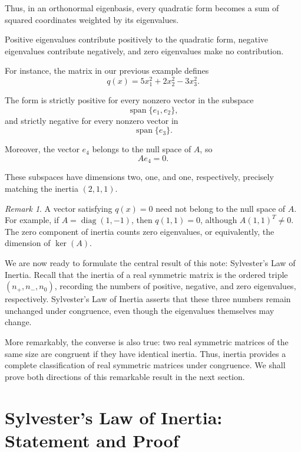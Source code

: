 \documentclass[11pt]{article}
\theoremstyle{definition}
\theoremstyle{remark}
\newtheorem{remark}[theorem]{Remark}
\begin{document}
Thus, in an orthonormal eigenbasis, every
quadratic form becomes a sum of squared
coordinates weighted by its eigenvalues.

Positive eigenvalues contribute positively
to the quadratic form, negative eigenvalues
contribute negatively, and zero eigenvalues
make no contribution.

For instance, the matrix in our previous
example defines
\[
    q(x)=5x_1^2+2x_2^2-3x_3^2.
\]

The form is strictly positive for every
nonzero vector in the subspace
\[
    \operatorname{span}\{e_1,e_2\},
\]
and strictly negative for every nonzero
vector in
\[
    \operatorname{span}\{e_3\}.
\]

Moreover, the vector $e_4$ belongs to the
null space of $A$, so
\[
    Ae_4=0.
\]

These subspaces have dimensions two, one,
and one, respectively, precisely matching
the inertia $(2,1,1)$.

\begin{remark}
A vector satisfying $q(x)=0$ need not belong
to the null space of $A$. For example, if
$A=\operatorname{diag}(1,-1)$, then
$q(1,1)=0$, although $A(1,1)^T\neq 0$.
The zero component of inertia counts zero
eigenvalues, or equivalently, the dimension
of $\ker(A)$.
\end{remark}

We are now ready to formulate the central result of
this note: Sylvester's Law of Inertia. Recall that
the inertia of a real symmetric matrix is the ordered
triple $(n_+,n_-,n_0)$, recording the numbers of
positive, negative, and zero eigenvalues, respectively.
Sylvester's Law of Inertia asserts that these three
numbers remain unchanged under congruence, even
though the eigenvalues themselves may change.

More remarkably, the converse is also true: two
real symmetric matrices of the same size are
congruent if they have identical inertia.
Thus, inertia provides a complete classification
of real symmetric matrices under congruence.
We shall prove both directions of this remarkable
result in the next section.


\section{Sylvester's Law of Inertia: Statement and Proof}
\end{document}
